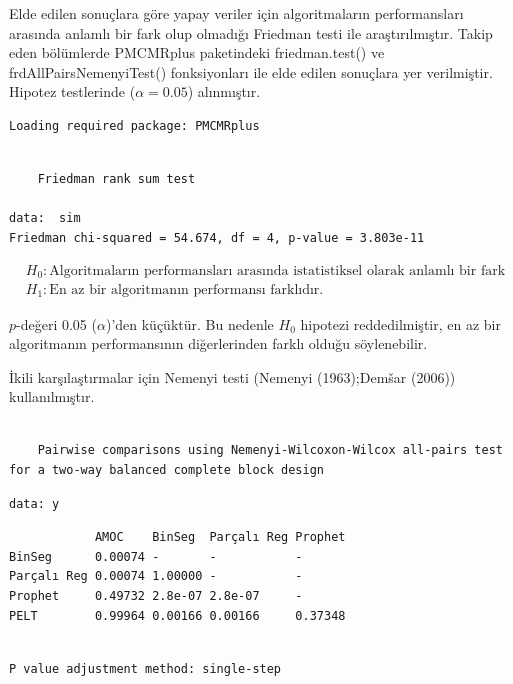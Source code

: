 \documentclass[12pt,twoside]{deuthesis}
\begin{document}
Elde edilen sonuçlara göre yapay veriler için algoritmaların performansları arasında anlamlı bir fark olup olmadığı Friedman testi ile araştırılmıştır. Takip eden bölümlerde PMCMRplus paketindeki friedman.test() ve frdAllPairsNemenyiTest() fonksiyonları ile elde edilen sonuçlara yer verilmiştir. Hipotez testlerinde (\(\alpha=0.05\)) alınmıştır.

\begin{verbatim}
Loading required package: PMCMRplus
\end{verbatim}

\begin{verbatim}

    Friedman rank sum test

data:  sim
Friedman chi-squared = 54.674, df = 4, p-value = 3.803e-11
\end{verbatim}

\begin{align*}
&H_0:\text{Algoritmaların performansları arasında istatistiksel olarak anlamlı bir fark yoktur.} \\
&H_1:\text{En az bir algoritmanın performansı farklıdır.}
\end{align*}

\(p\)-değeri 0.05 (\(\alpha\))'den küçüktür. Bu nedenle \(H_0\) hipotezi reddedilmiştir, en az bir algoritmanın performansının diğerlerinden farklı olduğu söylenebilir.

İkili karşılaştırmalar için Nemenyi testi (Nemenyi (1963);Demšar (2006)) kullanılmıştır.

\begin{verbatim}

    Pairwise comparisons using Nemenyi-Wilcoxon-Wilcox all-pairs test for a two-way balanced complete block design
\end{verbatim}

\begin{verbatim}
data: y
\end{verbatim}

\begin{verbatim}
            AMOC    BinSeg  Parçalı Reg Prophet
BinSeg      0.00074 -       -           -      
Parçalı Reg 0.00074 1.00000 -           -      
Prophet     0.49732 2.8e-07 2.8e-07     -      
PELT        0.99964 0.00166 0.00166     0.37348
\end{verbatim}

\begin{verbatim}

P value adjustment method: single-step
\end{verbatim}
\end{document}
